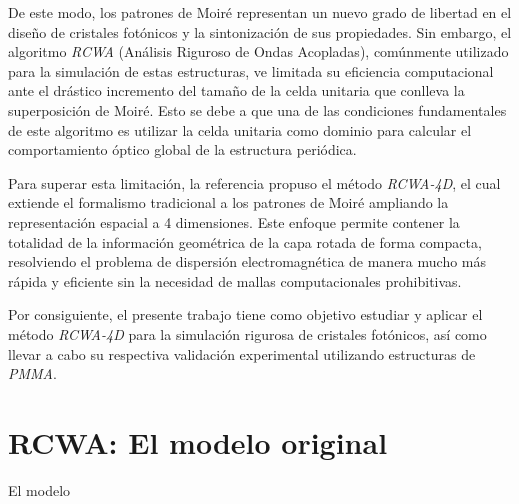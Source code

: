 \documentclass[a4paper, amsfonts, amssymb, amsmath, reprint, showkeys, nofootinbib, twoside]{revtex4-1}
\begin{document}
De este modo, los patrones de Moiré representan un nuevo grado de libertad en el diseño de cristales fotónicos y la sintonización de sus propiedades. Sin embargo, el algoritmo \textit{RCWA} (Análisis Riguroso de Ondas Acopladas), comúnmente utilizado para la simulación de estas estructuras, ve limitada su eficiencia computacional ante el drástico incremento del tamaño de la celda unitaria que conlleva la superposición de Moiré. Esto se debe a que una de las condiciones fundamentales de este algoritmo es utilizar la celda unitaria como dominio para calcular el comportamiento óptico global de la estructura periódica.

Para superar esta limitación, la referencia \cite{lou2025rcwa4d} propuso el método \textit{RCWA-4D}, el cual extiende el formalismo tradicional a los patrones de Moiré ampliando la representación espacial a 4 dimensiones. Este enfoque permite contener la totalidad de la información geométrica de la capa rotada de forma compacta, resolviendo el problema de dispersión electromagnética de manera mucho más rápida y eficiente sin la necesidad de mallas computacionales prohibitivas.

Por consiguiente, el presente trabajo tiene como objetivo estudiar y aplicar el método \textit{RCWA-4D} para la simulación rigurosa de cristales fotónicos, así como llevar a cabo su respectiva validación experimental utilizando estructuras de \textit{PMMA}.

\section{RCWA: El modelo original}

El modelo 
\end{document}
